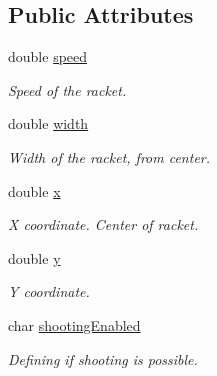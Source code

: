 \subsection*{Public Attributes}
\begin{DoxyCompactItemize}
\item 
\mbox{\label{class_racket_a983c4183fdc7338ddfc0bc1696cf93eb}} 
double \hyperlink{class_racket_a983c4183fdc7338ddfc0bc1696cf93eb}{speed}
\begin{DoxyCompactList}\small\item\em Speed of the racket. \end{DoxyCompactList}\item 
\mbox{\label{class_racket_a13391bbcabb61d9df5558865971e43f8}} 
double \hyperlink{class_racket_a13391bbcabb61d9df5558865971e43f8}{width}
\begin{DoxyCompactList}\small\item\em Width of the racket, from center. \end{DoxyCompactList}\item 
\mbox{\label{class_racket_abbee058cfc982a0726e81ee7d9e6a34e}} 
double \hyperlink{class_racket_abbee058cfc982a0726e81ee7d9e6a34e}{x}
\begin{DoxyCompactList}\small\item\em X coordinate. Center of racket. \end{DoxyCompactList}\item 
\mbox{\label{class_racket_abc335dd83b72c2008f32c1130aac70d4}} 
double \hyperlink{class_racket_abc335dd83b72c2008f32c1130aac70d4}{y}
\begin{DoxyCompactList}\small\item\em Y coordinate. \end{DoxyCompactList}\item 
\mbox{\label{class_racket_a080094786cc70722b80f34bcf88b7694}} 
char \hyperlink{class_racket_a080094786cc70722b80f34bcf88b7694}{shooting\+Enabled}
\begin{DoxyCompactList}\small\item\em Defining if shooting is possible. \end{DoxyCompactList}\end{DoxyCompactItemize}


